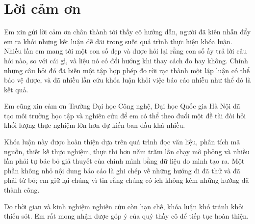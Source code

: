 \chapter*{Lời cảm ơn}

Em xin gửi lời cảm ơn chân thành tới thầy cô hướng dẫn, người đã kiên nhẫn đẩy em ra khỏi
những kết luận dễ dãi trong suốt quá trình thực hiện khóa luận. Nhiều lần em mang tới một
con số đẹp và được hỏi lại rằng con số ấy trả lời câu hỏi nào, so với cái gì, và liệu nó có
đổi hướng khi thay cách đo hay không. Chính những câu hỏi đó đã biến một tập hợp phép đo rời
rạc thành một lập luận có thể bảo vệ được, và đã nhiều lần cứu khóa luận khỏi việc báo cáo
nhiễu như thể đó là kết quả.

Em cũng xin cảm ơn Trường Đại học Công nghệ, Đại học Quốc gia Hà Nội đã tạo môi trường học
tập và nghiên cứu để em có thể theo đuổi một đề tài đòi hỏi khối lượng thực nghiệm lớn hơn
dự kiến ban đầu khá nhiều.

Khóa luận này được hoàn thiện dựa trên quá trình đọc văn liệu, phân tích mã nguồn, thiết kế
thực nghiệm, thực thi hơn năm trăm lần chạy mô phỏng và nhiều lần phải tự bác bỏ giả thuyết
của chính mình bằng dữ liệu do mình tạo ra. Một phần không nhỏ nội dung báo cáo là ghi chép
về những hướng đi đã thử và đã phải từ bỏ; em giữ lại chúng vì tin rằng chúng có ích không
kém những hướng đã thành công.

Do thời gian và kinh nghiệm nghiên cứu còn hạn chế, khóa luận khó tránh khỏi thiếu sót. Em
rất mong nhận được góp ý của quý thầy cô để tiếp tục hoàn thiện.

\clearpage
